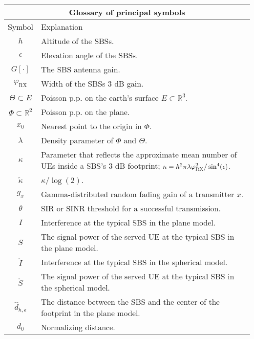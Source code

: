 \documentclass[conference]{IEEEtran}
\newcommand{\R}{\mathbb{R}}
\theoremstyle{definition}
\theoremstyle{plain}
\begin{document}
         
         \begin{table}
           \begin{center}
             \begin{tabular}{| c | p{7cm}  |}
               \hline
               \multicolumn{2}{|c|}{Glossary of principal symbols} \\
               \hline
               Symbol& Explanation 
               \\ 
               \hline
               $h$ & Altitude of the SBSs. \\
               $\epsilon$ & Elevation angle of the SBSs. \\
               $G[\cdot]$ & The SBS antenna gain.\\
               $\varphi_{\text{RX}}$ & Width of the SBSs $3$ dB gain. \\
               $\Theta \subset E $ & Poisson p.p. on the earth's surface $E \subset \R^3$. \\
               $\Phi \subset \R^2$ & Poisson p.p. on the plane. \\
               $x_0$ & Nearest point to the origin in $\Phi$.  \\
               $\lambda$ & Density parameter of $\Phi$ and $\Theta$. \\
               $\kappa$ & Parameter that reflects the approximate mean number of UEs inside a SBS's $3$ dB footprint;  $\kappa = h^2\pi \lambda \varphi_{\textup{RX}}^2/\sin^4(\epsilon)$. \\
               ${\tilde{\kappa}}$ &  $\kappa/\log(2)$.\\
               $g_x$ &   Gamma-distributed random fading gain of a transmitter $x$.     \\
               $\theta$ & SIR or SINR threshold for a successful transmission.\\
               $I$ & Interference at the typical SBS in the plane model.\\
               $S$ & The signal power of the served UE at the typical SBS in the plane model.\\
               $\mathring{I}$ & Interference at the typical SBS in the spherical model.\\
               $\mathring{S}$ & The signal power of the served UE at the typical SBS in the spherical model.\\ 
               $\hat{d}_{h,\epsilon}$ & The distance between the SBS and the center of the footprint in the plane model.\\
               $d_{0}$ & Normalizing distance.  \\                        
               \hline
             \end{tabular}
           \end{center}
         \end{table}   
\end{document}
